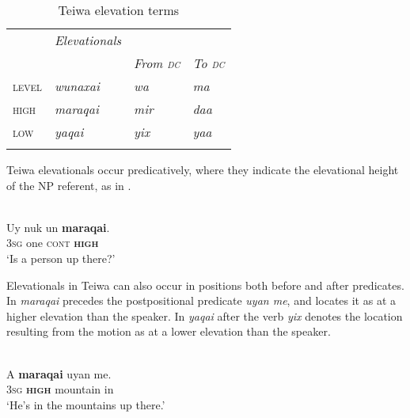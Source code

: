  



\begin{table}
\begin{tabularx}{\textwidth}{X>{\it}X>{\it}X>{\it}l}
\lsptoprule
 & \rm Elevationals & \multicolumn{2}{c}{\rm Elevational\ist{elevation} motion\is{motion} verb}\\
 &  & \rm From \textsc{dc} & \rm To \textsc{dc}\\
\midrule
{\scshape level} & {wunaxai} & {wa} & ma\\
{\scshape high} & {maraqai} & {mir} & daa\\
{\scshape low} & {yaqai} & {yix} & yaa\\
\lspbottomrule
\end{tabularx}

\caption{Teiwa elevation terms}
\label{tab:7:teiwa}
\end{table}

Teiwa elevationals occur predicatively, where they indicate the elevational height of the NP referent, as in . 

 

\ea%
\label{ex:7:6}
 \\
\gll  Uy  nuk   un  \textbf{maraqai}. \\
       \textsc{3sg} one  \textsc{cont} \textbf{\textsc{high}} \\
\glt `Is a person up there?'
\z



 

 

Elevationals in Teiwa can also occur in positions both before and after predicates. In  \textit{maraqai} precedes the postpositional predicate \textit{uyan me{\textglotstop}}, and locates it as at a higher elevation than the speaker. In  \textit{yaqai} after the verb \textit{yix} denotes the location resulting from the motion as at a lower elevation than the speaker.



\ea%
\label{ex:7:7}
 \\
\gll A  \textbf{{maraqai}} {uyan}  me{\textglotstop}{.} \\
      \textsc{3sg} \textbf{\textsc{high}} mountain  in    \\
\glt `He's in the mountains up there.'  
\z

